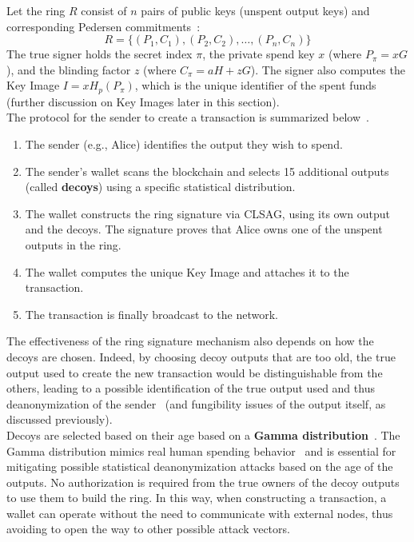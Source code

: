 \documentclass[conference]{IEEEtran}
\begin{document}
Let the ring $R$ consist of $n$ pairs of public keys (unspent output keys) and corresponding Pedersen commitments~\cite{ringct}:
\[
R = \{ (P_1, C_1), (P_2, C_2), \dots, (P_n, C_n) \}
\]
The true signer holds the secret index $\pi$, the private spend key $x$ (where $P_{\pi} = xG$), and the blinding factor $z$ (where $C_{\pi} = aH + zG$). The signer also computes the Key Image $I = xH_p(P_{\pi})$, which is the unique identifier of the spent funds (further discussion on Key Images later in this section).\\
The protocol for the sender to create a transaction is summarized below~\cite{cryptonote, zero_to_monero_2}.
\begin{enumerate}
\item The sender (e.g., Alice) identifies the output they wish to spend.
\item The sender's wallet scans the blockchain and selects 15 additional outputs (called \textbf{decoys}) using a specific statistical distribution.
\item The wallet constructs the ring signature via CLSAG, using its own output and the decoys. The signature proves that Alice owns one of the unspent outputs in the ring.
\item The wallet computes the unique Key Image and attaches it to the transaction.
\item The transaction is finally broadcast to the network.
\end{enumerate}

\medskip
The effectiveness of the ring signature mechanism also depends on how the decoys are chosen. Indeed, by choosing decoy outputs that are too old, the true output used to create the new transaction would be distinguishable from the others, leading to a possible identification of the true output used and thus deanonymization of the sender~\cite{traceability_monero_blockchain} (and fungibility issues of the output itself, as discussed previously).\\
Decoys are selected based on their age based on a \textbf{Gamma distribution}~\cite{zero_to_monero_2}. The Gamma distribution mimics real human spending behavior~\cite{gamma_sampling} and is essential for mitigating possible statistical deanonymization attacks based on the age of the outputs. No authorization is required from the true owners of the decoy outputs to use them to build the ring. In this way, when constructing a transaction, a wallet can operate without the need to communicate with external nodes, thus avoiding to open the way to other possible attack vectors.\\
\end{document}
